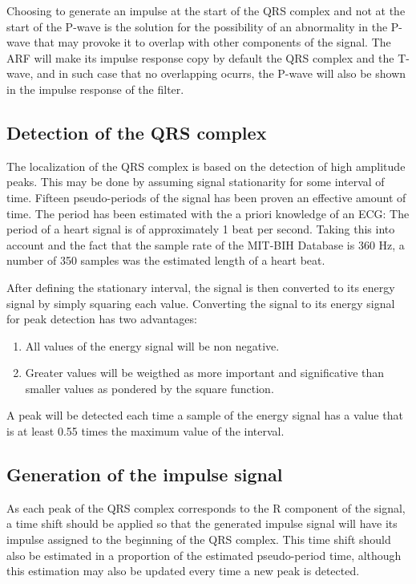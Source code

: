 \documentclass[conference]{IEEEtran}
\begin{document}
Choosing to generate an impulse at the start of the QRS complex and not at the start of the P-wave is the solution for the possibility of an abnormality in the P-wave that may provoke it to overlap with other components of the signal. The ARF will make its impulse response copy by default the QRS complex and the T-wave, and in such case that no overlapping ocurrs, the P-wave will also be shown in the impulse response of the filter.

\subsection{Detection of the QRS complex}

The localization of the QRS complex is based on the detection of high amplitude peaks. This may be done by assuming signal stationarity for some interval of time. Fifteen pseudo-periods of the signal has been proven an effective amount of time. The period has been estimated with the a priori knowledge of an ECG: The period of a heart signal is of approximately 1 beat per second. Taking this into account and the fact that the sample rate of the MIT-BIH Database is 360 Hz, a number of 350 samples was the estimated length of a heart beat. \par
After defining the stationary interval, the signal is then converted to its energy signal by simply squaring each value. Converting the signal to its energy signal for peak detection has two advantages:

\begin{enumerate}
\item All values of the energy signal will be non negative.
\item Greater values will be weigthed as more important and significative than smaller values as pondered by the square function.
\end{enumerate}

A peak will be detected each time a sample of the energy signal has a value that is at least 0.55 times the maximum value of the interval.

\subsection{Generation of the impulse signal}

As each peak of the QRS complex corresponds to the R component of the signal, a time shift should be applied so that the generated impulse signal will have its impulse assigned to the beginning of the QRS complex. This time shift should also be estimated in a proportion of the estimated pseudo-period time, although this estimation may also be updated every time a new peak is detected.
\end{document}
